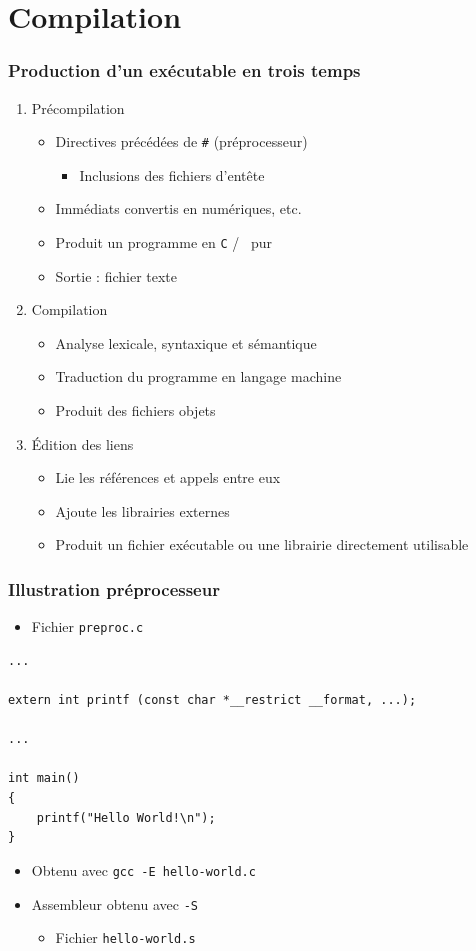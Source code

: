 \section{Compilation}

\begin{frame}
\frametitle{Production d'un exécutable en trois temps}
\begin{enumerate}[<+->]
\item Précompilation
	\begin{itemize}
	\item Directives précédées de \texttt{\#} (préprocesseur)
		\begin{itemize}
		\item Inclusions des fichiers d'entête		
		\end{itemize}
	\item Immédiats convertis en numériques, etc.
	\item Produit un programme en \texttt{C} / \cpp\ pur
	\item Sortie : fichier texte
	\end{itemize}
\item Compilation
	\begin{itemize}
	\item Analyse lexicale, syntaxique et sémantique
	\item Traduction du programme en langage machine
	\item Produit des fichiers objets
	\end{itemize}
\item Édition des liens
	\begin{itemize}
	\item Lie les références et appels entre eux
	\item Ajoute les librairies externes
	\item Produit un fichier exécutable ou une librairie directement utilisable
	\end{itemize}
\end{enumerate}
\end{frame}

\begin{frame}[containsverbatim]
\frametitle{Illustration préprocesseur}
\begin{itemize}
\item Fichier \texttt{preproc.c}
\end{itemize}
\begin{lstlisting}
... 

extern int printf (const char *__restrict __format, ...);

...

int main()
{
	printf("Hello World!\n");
}
\end{lstlisting}
\begin{itemize}
\item Obtenu avec \texttt{gcc -E hello-world.c}
\item Assembleur obtenu avec \texttt{-S}
	\begin{itemize}
	\item Fichier \texttt{hello-world.s}
	\end{itemize}
\end{itemize}
\end{frame}

